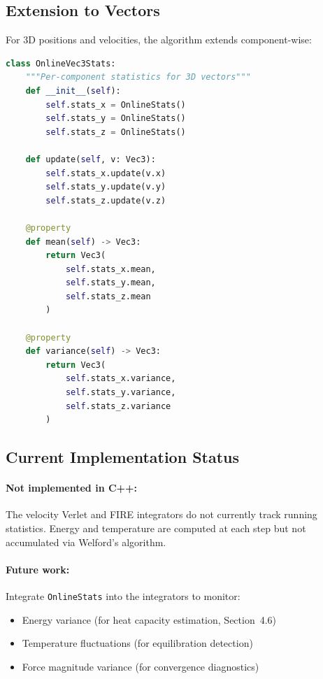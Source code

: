 \documentclass[11pt]{article}
\begin{document}
\subsection{Extension to Vectors}

For 3D positions and velocities, the algorithm extends component-wise:

\begin{lstlisting}[language=Python]
class OnlineVec3Stats:
    """Per-component statistics for 3D vectors"""
    def __init__(self):
        self.stats_x = OnlineStats()
        self.stats_y = OnlineStats()
        self.stats_z = OnlineStats()
    
    def update(self, v: Vec3):
        self.stats_x.update(v.x)
        self.stats_y.update(v.y)
        self.stats_z.update(v.z)
    
    @property
    def mean(self) -> Vec3:
        return Vec3(
            self.stats_x.mean,
            self.stats_y.mean,
            self.stats_z.mean
        )
    
    @property
    def variance(self) -> Vec3:
        return Vec3(
            self.stats_x.variance,
            self.stats_y.variance,
            self.stats_z.variance
        )
\end{lstlisting}

\subsection{Current Implementation Status}

\paragraph{Not implemented in C++:} The velocity Verlet and FIRE integrators do not currently track running statistics. Energy and temperature are computed at each step but not accumulated via Welford's algorithm.

\paragraph{Future work:} Integrate \texttt{OnlineStats} into the integrators to monitor:
\begin{itemize}
\item Energy variance (for heat capacity estimation, Section~4.6)
\item Temperature fluctuations (for equilibration detection)
\item Force magnitude variance (for convergence diagnostics)
\end{itemize}
\end{document}
